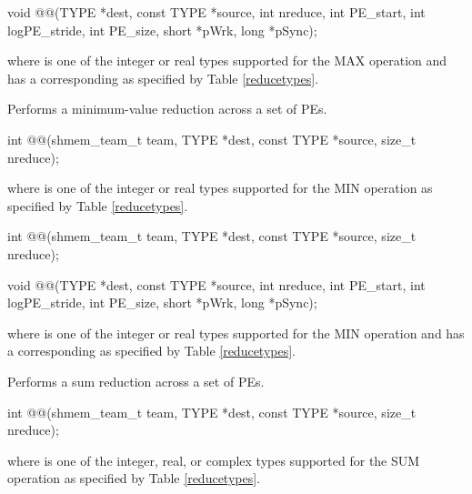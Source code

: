 \begin{apidefinition}
\begin{DeprecateBlock}
\begin{CsynopsisCol}
void @@(TYPE *dest, const TYPE *source, int nreduce, int PE_start, int logPE_stride, int PE_size, short *pWrk, long *pSync);
\end{CsynopsisCol}
\end{DeprecateBlock}
where \TYPE{} is one of the integer or real types supported for the MAX operation and has a corresponding \TYPENAME{} as specified by Table \ref{reducetypes}.

Performs a minimum-value reduction across a set of \acp{PE}.\newline

\begin{C11synopsis}
int @@(shmem_team_t team, TYPE *dest, const TYPE *source, size_t nreduce);
\end{C11synopsis}
where \TYPE{} is one of the integer or real types supported for the MIN operation as specified by Table \ref{reducetypes}.

\begin{Csynopsis}
\end{Csynopsis}

\begin{CsynopsisCol}
int @@(shmem_team_t team, TYPE *dest, const TYPE *source, size_t nreduce);
\end{CsynopsisCol}

\begin{DeprecateBlock}
\begin{CsynopsisCol}
void @@(TYPE *dest, const TYPE *source, int nreduce, int PE_start, int logPE_stride, int PE_size, short *pWrk, long *pSync);
\end{CsynopsisCol}
\end{DeprecateBlock}
where \TYPE{} is one of the integer or real types supported for the MIN operation and has a corresponding \TYPENAME{} as specified by Table \ref{reducetypes}.

Performs a sum reduction across a set of \acp{PE}.\newline

\begin{C11synopsis}
int @@(shmem_team_t team, TYPE *dest, const TYPE *source, size_t nreduce);
\end{C11synopsis}
where \TYPE{} is one of the integer, real, or complex types supported for the SUM operation as specified by Table \ref{reducetypes}.


\end{apidefinition}
